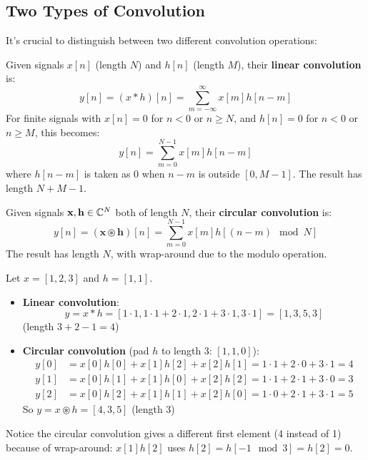 \begin{notechapter}
\subsection{Two Types of Convolution}

It's crucial to distinguish between two different convolution operations:

\begin{definition}
Given signals $x[n]$ (length $N$) and $h[n]$ (length $M$), their 
\textbf{linear convolution} is:
\begin{equation}
y[n] = (x * h)[n] = \sum_{m=-\infty}^{\infty} x[m] h[n-m]
\end{equation}
For finite signals with $x[n]=0$ for $n<0$ or $n\geq N$, and 
$h[n]=0$ for $n<0$ or $n\geq M$, this becomes:
\begin{equation}
y[n] = \sum_{m=0}^{N-1} x[m] h[n-m]
\end{equation}
where $h[n-m]$ is taken as 0 when $n-m$ is outside $[0, M-1]$. The 
result has length $N+M-1$.
\end{definition}

\begin{definition}
Given signals $\mathbf{x}, \mathbf{h} \in \mathbb{C}^N$ both of length $N$, 
their \textbf{circular convolution} is:
\begin{equation}
y[n] = (\mathbf{x} \circledast \mathbf{h})[n] = \sum_{m=0}^{N-1} x[m] 
        h[(n-m) \mod N]
\end{equation}
The result has length $N$, with wrap-around due to the modulo operation.
\end{definition}

\begin{example}
Let $x = [1, 2, 3]$ and $h = [1, 1]$.
\begin{itemize}
\item \textbf{Linear convolution}: 
  \[
  y = x * h = [1\cdot1, 1\cdot1+2\cdot1, 2\cdot1+3\cdot1, 3\cdot1] 
    = [1, 3, 5, 3]
  \]
  (length $3+2-1 = 4$)
\item \textbf{Circular convolution} (pad $h$ to length 3: $[1, 1, 0]$):
  \begin{align*}
  y[0] &= x[0]h[0] + x[1]h[2] + x[2]h[1] = 1\cdot1 + 2\cdot0 + 3\cdot1 = 4 \\
  y[1] &= x[0]h[1] + x[1]h[0] + x[2]h[2] = 1\cdot1 + 2\cdot1 + 3\cdot0 = 3 \\
  y[2] &= x[0]h[2] + x[1]h[1] + x[2]h[0] = 1\cdot0 + 2\cdot1 + 3\cdot1 = 5
  \end{align*}
  So $y = x \circledast h = [4, 3, 5]$ (length 3)
\end{itemize}
Notice the circular convolution gives a different first element (4 instead of 1)
because of wrap-around: $x[1]h[2]$ uses $h[2] = h[-1 \mod 3] = h[2] = 0$.
\end{example}


\end{notechapter}
